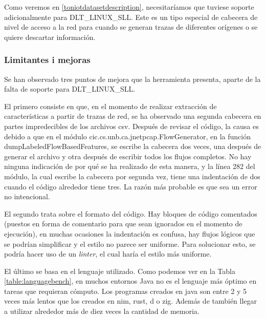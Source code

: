 Como veremos en \ref{toniotdatasetdescription}, necesitaríamos que tuviese soporte adicionalmente para DLT\_LINUX\_SLL. Este es un tipo especial de cabecera de nivel de acceso a la red para cuando se generan trazas de diferentes orígenes o se quiere descartar información.

\subsubsection{Limitantes i mejoras}

Se han observado tres puntos de mejora que la herramienta presenta, aparte de la falta de soporte para DLT\_LINUX\_SLL.

El primero consiste en que, en el momento de realizar extracción de características a partir de trazas de red, se ha observado una segunda cabecera en partes impredecibles de los archivos csv. Después de revisar el código, la causa es debido a que en el módulo cic.cs.unb.ca.jnetpcap.FlowGenerator, en la función dumpLabeledFlowBasedFeatures, se escribe la cabecera dos veces, una después de generar el archivo y otra después de escribir todos los flujos completos. No hay ninguna indicación de por qué se ha realizado de esta manera, y la línea 282 del módulo, la cual escribe la cabecera por segunda vez, tiene una indentación de dos cuando el código alrededor tiene tres. La razón más probable es que sea un error no intencional.

El segundo trata sobre el formato del código. Hay bloques de código comentados (puestos en forma de comentario para que sean ignorados en el momento de ejecución), en muchas ocasiones la indentación es confusa, hay flujos lógicos que se podrían simplificar y el estilo no parece ser uniforme. Para solucionar esto, se podría hacer uso de un \textit{linter}, el cual haría el estilo más uniforme.

El último se basa en el lenguaje utilizado. Como podemos ver en la Tabla \ref{table:languagebench}, en muchos entornos Java no es el lenguaje más óptimo en tareas que requieran cómputo. Los programas creados en java son entre 2 y 5 veces más lentos que los creados en nim, rust, d o zig. Además de también llegar a utilizar alrededor más de diez veces la cantidad de memoria.

